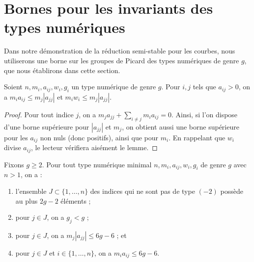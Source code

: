 \section{Bornes pour les invariants des types numériques}
\label{section-towards-classification}

\noindent
Dans notre démonstration de la réduction semi-stable pour les courbes, nous utiliserons une borne
sur les groupes de Picard des types numériques de genre $g$, que nous établirons
dans cette section.

\begin{lemma}
\label{lemma-bound-neighbours}
Soient $n, m_i, a_{ij}, w_i, g_i$ un type numérique de genre $g$.
Pour $i, j$ tels que $a_{ij} > 0$, on a
$m_ia_{ij} \leq m_j|a_{jj}|$ et $m_iw_i \leq m_j|a_{jj}|$.
\end{lemma}

\begin{proof}
Pour tout indice $j$, on a $m_j a_{jj} + \sum_{i \not = j} m_ia_{ij} = 0$.
Ainsi, si l'on dispose d'une borne supérieure pour $|a_{jj}|$ et $m_j$, on obtient aussi une
borne supérieure pour les $a_{ij}$ non nuls (donc positifs), ainsi que pour
$m_i$. En rappelant que $w_i$ divise $a_{ij}$, le lecteur vérifiera aisément
le lemme.
\end{proof}

\begin{lemma}
\label{lemma-bound-heart}
Fixons $g \geq 2$. Pour tout type numérique minimal $n, m_i, a_{ij}, w_i, g_i$
de genre $g$ avec $n > 1$, on a :
\begin{enumerate}
\item l'ensemble $J \subset \{1, \ldots, n\}$ des indices qui ne sont pas de type $(-2)$
possède au plus $2g - 2$ éléments ;
\item pour $j \in J$, on a $g_j < g$ ;
\item pour $j \in J$, on a $m_j|a_{jj}| \leq 6g - 6$ ; et
\item pour $j \in J$ et $i \in \{1, \ldots, n\}$,
on a $m_ia_{ij} \leq 6g - 6$.
\end{enumerate}
\end{lemma}

